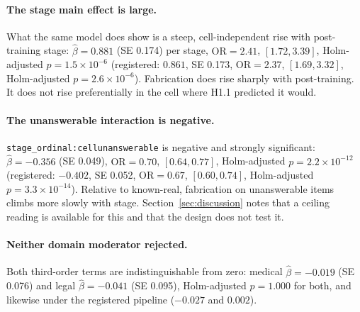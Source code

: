\paragraph{The stage main effect is large.}
What the same model does show is a steep, cell-independent rise with
post-training stage: $\hat\beta = 0.881$ (SE 0.174) per stage,
$\mathrm{OR} = 2.41$, $[1.72, 3.39]$, Holm-adjusted $p = 1.5 \times 10^{-6}$
(registered: $0.861$, SE 0.173, $\mathrm{OR} = 2.37$, $[1.69, 3.32]$,
Holm-adjusted $p = 2.6 \times 10^{-6}$). Fabrication does rise sharply with
post-training. It does not rise preferentially in the cell where H1.1 predicted
it would.

\paragraph{The unanswerable interaction is negative.}
\texttt{stage\_ordinal:cellunanswerable} is negative and strongly significant:
$\hat\beta = -0.356$ (SE 0.049), $\mathrm{OR} = 0.70$, $[0.64, 0.77]$,
Holm-adjusted $p = 2.2 \times 10^{-12}$ (registered: $-0.402$, SE 0.052,
$\mathrm{OR} = 0.67$, $[0.60, 0.74]$, Holm-adjusted $p = 3.3 \times 10^{-14}$).
Relative to known-real, fabrication on unanswerable items climbs more slowly
with stage. Section~\ref{sec:discussion} notes that a ceiling reading is
available for this and that the design does not test it.

\paragraph{Neither domain moderator rejected.}
Both third-order terms are indistinguishable from zero:
medical $\hat\beta = -0.019$ (SE 0.076) and legal $\hat\beta = -0.041$
(SE 0.095), Holm-adjusted $p = 1.000$ for both, and likewise under the
registered pipeline ($-0.027$ and $0.002$).

